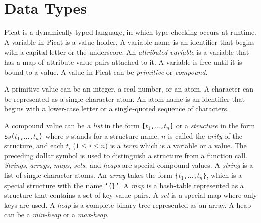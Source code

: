 \section{Data Types}
Picat is a dynamically-typed language, in which type checking occurs at runtime. A variable in Picat is a value holder. A variable name is an identifier that begins with a capital letter or the underscore. An \emph{attributed variable} is a variable that has a map of attribute-value pairs attached to it. A variable is free until it is bound to a value. A value in Picat can be \emph{primitive} or \emph{compound}. 

A primitive value can be an integer, a real number, or an atom. A character can be represented as a single-character atom.  An atom name is an identifier that begins with a lower-case letter or a single-quoted sequence of characters. 

A compound value can be a \emph{list} in the form \texttt{[$t_1$,$\ldots$,$t_{n}$]} or a \emph{structure} in the form \texttt{\$$s$($t_1$,$\ldots$,$t_{n}$)} where $s$ stands for a structure name, $n$ is called the \emph{arity} of the structure, and each $t_i$ ($1\le i \le n$) is a \emph{term} which is a variable or a value. The preceding dollar symbol is used to distinguish a structure from a function call. \emph{Strings}, \emph{arrays}, \emph{maps}, \emph{sets}, and \emph{heaps} are special compound values. A \emph{string} is a list of single-character atoms. An \emph{array} takes the form \texttt{\{$t_1$,$\ldots$,$t_{n}$\}}, which is a special structure with the name \texttt{'\{\}'}. A \emph{map} is a hash-table represented as a structure that contains a set of key-value pairs. A \emph{set} is a special map where only keys are used.  A \emph{heap} is a complete binary tree represented as an array. A heap can be a \emph{min-heap} or a \emph{max-heap}.

